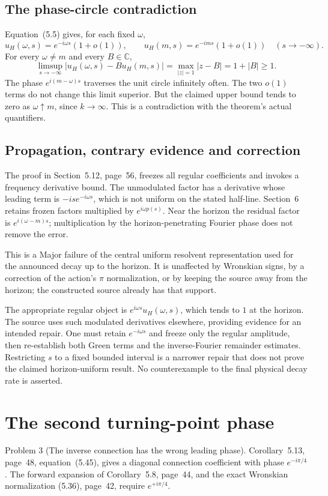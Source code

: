 \documentclass[10pt]{article}
\begin{document}
\subsection*{The phase-circle contradiction}
Equation (5.5) gives, for each fixed \(\omega\), \[u_H(\omega,s)=e^{-i\omega s}(1+o(1)),
 \qquad u_H(m,s)=e^{-ims}(1+o(1))
 \quad(s\longrightarrow-\infty).\] For every \(\omega\ne m\) and every \(B\in\mathbb C\), \[\limsup_{s\to-\infty}|u_H(\omega,s)-Bu_H(m,s)|
 =\max_{|z|=1}|z-B|=1+|B|\geq1.\] The phase \(e^{i(m-\omega)s}\) traverses the unit circle infinitely often. The two \(o(1)\) terms do not change this limit superior. But the claimed upper bound tends to zero as \(\omega\uparrow m\), since \(k\to\infty\). This is a contradiction with the theorem’s actual quantifiers.\par
\subsection*{Propagation, contrary evidence and correction}
The proof in Section 5.12, page 56, freezes all regular coefficients and invokes a frequency derivative bound. The unmodulated factor has a derivative whose leading term is \(-is e^{-i\omega s}\), which is not uniform on the stated half-line. Section 6 retains frozen factors multiplied by \(e^{i\omega p(s)}\). Near the horizon the residual factor is \(e^{i(\omega-m)s}\); multiplication by the horizon-penetrating Fourier phase does not remove the error.\par
This is a Major failure of the central uniform resolvent representation used for the announced decay up to the horizon. It is unaffected by Wronskian signs, by a correction of the action’s \(\pi\) normalization, or by keeping the source away from the horizon; the constructed source already has that support.\par
The appropriate regular object is \(e^{i\omega s}u_H(\omega,s)\), which tends to \(1\) at the horizon. The source uses such modulated derivatives elsewhere, providing evidence for an intended repair. One must retain \(e^{-i\omega s}\) and freeze only the regular amplitude, then re-establish both Green terms and the inverse-Fourier remainder estimates. Restricting \(s\) to a fixed bounded interval is a narrower repair that does not prove the claimed horizon-uniform result. No counterexample to the final physical decay rate is asserted.\par
\section*{The second turning-point phase}
Problem 3 (The inverse connection has the wrong leading phase).  Corollary 5.13, page 48, equation (5.45), gives a diagonal connection coefficient with phase \(e^{-i\pi/4}\). The forward expansion of Corollary 5.8, page 44, and the exact Wronskian normalization (5.36), page 42, require \(e^{+i\pi/4}\).\par
\end{document}
